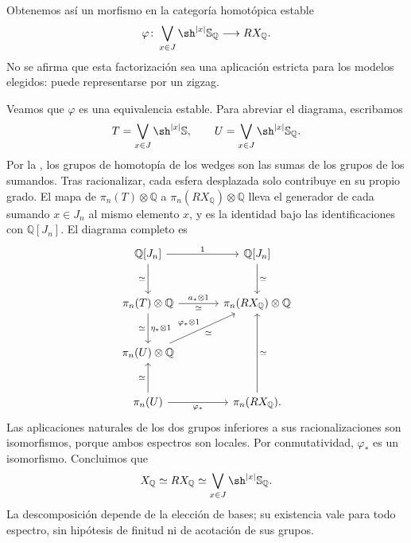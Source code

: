 Obtenemos así un morfismo en la categoría homotópica estable
\[
\varphi\colon\bigvee_{x\in J}\sh^{|x|}\mathbb S_{\mathbb Q}
\longrightarrow RX_{\mathbb Q}.
\]
No se afirma que esta factorización sea una aplicación estricta para los modelos elegidos: puede representarse por un zigzag.

Veamos que $\varphi$ es una equivalencia estable. Para abreviar el diagrama, escribamos
\[
T=\bigvee_{x\in J}\sh^{|x|}\mathbb S,
\qquad U=\bigvee_{x\in J}\sh^{|x|}\mathbb S_{\mathbb Q}.
\]
Por la , los grupos de homotopía de los wedges son las sumas de los grupos de los sumandos. Tras racionalizar, cada esfera desplazada solo contribuye en su propio grado. El mapa de $\pi_n(T)\otimes\mathbb Q$ a $\pi_n(RX_{\mathbb Q})\otimes\mathbb Q$ lleva el generador de cada sumando $x\in J_n$ al mismo elemento $x$, y es la identidad bajo las identificaciones con $\mathbb Q[J_n]$. El diagrama completo es
\[
\begin{tikzcd}[column sep=large,row sep=large]
\mathbb Q[J_n]\arrow[r,"1"]\arrow[d,"\simeq"']
&\mathbb Q[J_n]\arrow[d,"\simeq"]\\
\pi_n(T)\otimes\mathbb Q\arrow[r,"a_*\otimes1","\simeq"']
\arrow[d,"\eta_*\otimes1","\simeq"']
&\pi_n(RX_{\mathbb Q})\otimes\mathbb Q\\
\pi_n(U)\otimes\mathbb Q\arrow[ur,"\varphi_*\otimes1","\simeq"']&\\
\pi_n(U)\arrow[u,"\simeq"]\arrow[r,"\varphi_*"']
&\pi_n(RX_{\mathbb Q})\arrow[uu,"\simeq"'].
\end{tikzcd}
\]
Las aplicaciones naturales de los dos grupos inferiores a sus racionalizaciones son isomorfismos, porque ambos espectros son locales. Por conmutatividad, $\varphi_*$ es un isomorfismo. Concluimos que
\[
X_{\mathbb Q}\simeq RX_{\mathbb Q}
\simeq\bigvee_{x\in J}\sh^{|x|}\mathbb S_{\mathbb Q}.
\]
La descomposición depende de la elección de bases; su existencia vale para todo espectro, sin hipótesis de finitud ni de acotación de sus grupos.

